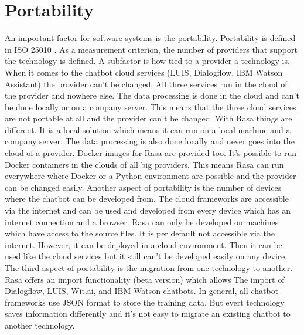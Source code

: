 
\section*{Portability}
An important factor for software systems is the portability.
Portability is defined in ISO 25010 \cite{iso25010}.
As a measurement criterion, the number of providers that support the technology is defined.
A subfactor is how tied to a provider a technology is.
When it comes to the chatbot cloud services (LUIS, Dialogflow, IBM Watson Assistant)
the provider can't be changed.
All three services run in the cloud of the provider and nowhere else.
The data processing is done in the cloud and can't be done locally or on a company server.
This means that the three cloud services are not portable at all and 
the provider can't be changed.
With Rasa things are different.
It is a local solution which means it can run on a local machine and a company server.
The data processing is also done locally and never goes into the cloud of a provider.
Docker images for Rasa are provided too.
It's possible to run Docker containers in the clouds of all big providers.
This means Rasa can run everywhere where Docker or a Python environment are possible 
and the provider can be changed easily.
Another aspect of portability is the number of devices where the chatbot can be developed
from.
The cloud frameworks are accessible via the internet and can be used 
and developed from every device which has an internet connection and a
browser.
Rasa can only be developed on machines which have access to the 
source files.
It is per default not accessible via the internet.
However, it can be deployed in a cloud environment.
Then it can be used like the cloud services but it 
still can't be developed easily on any device.
The third aspect of portability is the migration from one technology to another.
Rasa offers an import functionality (beta version) which allows The
import of Dialogflow, LUIS, Wit.ai, and IBM Watson chatbots.
In general, all chatbot frameworks use JSON format to store
the training data.
But evert technology saves information differently and it's not 
easy to migrate an existing chatbot to another technology.

